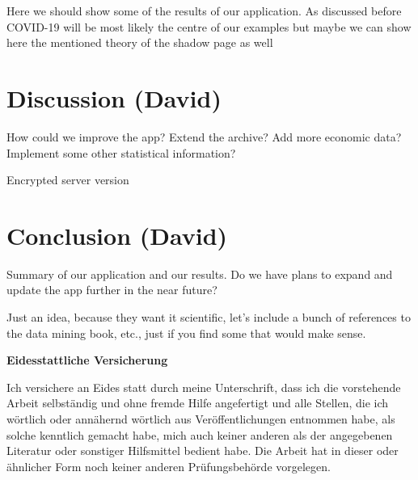 \documentclass[12pt,a4paper]{article}
\begin{document}
Here we should show some of the results of our application. As discussed before COVID-19 will be most likely the centre of our examples but maybe we can show here the mentioned theory of the shadow page as well

\hypertarget{discussion-david}{%
\section{Discussion (David)}\label{discussion-david}}

How could we improve the app? Extend the archive? Add more economic data? Implement some other statistical information?

Encrypted server version

\hypertarget{conclusion-david}{%
\section{Conclusion (David)}\label{conclusion-david}}

Summary of our application and our results. Do we have plans to expand and update the app further in the near future?

Just an idea, because they want it scientific, let's include a bunch of references to the data mining book, etc., just if you find some that would make sense.

\newpage


\newpage
\textbf{Eidesstattliche Versicherung}

\bigskip

Ich versichere an Eides statt durch meine Unterschrift, dass ich die vorstehende Arbeit selbständig und ohne fremde Hilfe angefertigt und alle Stellen, die ich wörtlich oder annähernd wörtlich aus Veröffentlichungen entnommen habe, als solche kenntlich gemacht habe, mich auch keiner anderen als der angegebenen Literatur oder sonstiger Hilfsmittel bedient habe. Die Arbeit hat in dieser oder ähnlicher Form noch keiner anderen Prüfungsbehörde vorgelegen.

\vspace{1cm}
\rule{0pt}{2\baselineskip} %
\par\noindent{} \hfill\makebox[2.25in]{\hrulefill}%
\par\noindent\makebox[2.25in][l]{} \hfill{}%
\end{document}
